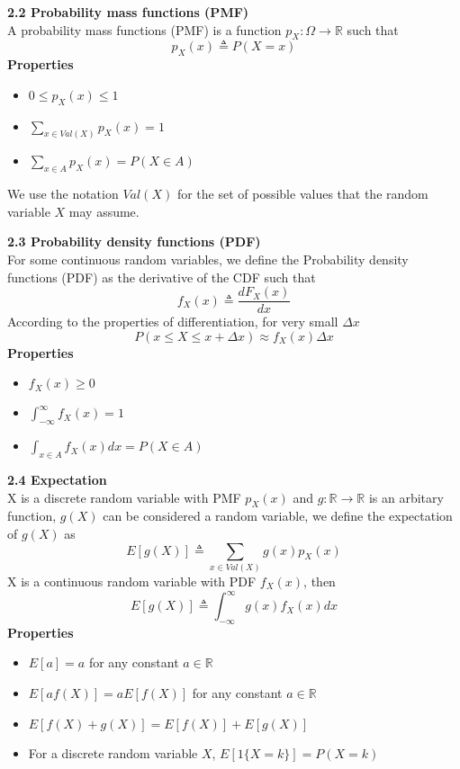 \documentclass[10pt,a4paper,oneside]{beamer}
\begin{document}
\begin{frame}
\vspace{0.3cm}
{\bfseries 2.2 Probability mass functions (PMF)} 
\vspace{0.3cm}
\\A probability mass functions (PMF) is a function $p_{X} : \Omega \rightarrow\mathbb{R}$ such that
\[
p_{X}(x) \triangleq P(X = x)
\]
{\bfseries Properties}
\begin{itemize}
	\item $0 \leqslant p_{X}(x) \leqslant 1$
	\item $\sum_{x\in V al(X)}p_{X}(x)=1$ 
	\item $\sum_{x\in A}p_{X}(x)=P(X\in A)$ 
\end{itemize} 
\vspace{0.5cm}
We use the notation $Val(X)$ for the set of possible values that the random variable $X$ may assume.
\end{frame}
\begin{frame}
\vspace{0.3cm}
{\bfseries 2.3 Probability density functions (PDF)} 
\vspace{0.3cm}
\\For some continuous random variables, we define the Probability density functions (PDF) as the derivative of the CDF such that 
\[
f_{X}(x) \triangleq \frac{dF_X(x)}{dx}
\]
According to the properties of differentiation, for very small $\Delta x$
\[
P(x \leqslant X \leqslant x+\Delta x) \approx f_{X}(x) \Delta x
\]
{\bfseries Properties}
\begin{itemize}
	\item $f_{X}(x) \geqslant 0$
	\item $\int_{-\infty}^{\infty} f_{X}(x)=1$ 
	\item $\int_{x \in A} f_{X}(x) d x=P(X \in A)$
\end{itemize} 
\end{frame}
\begin{frame}
\vspace{0.1cm}
{\bfseries 2.4 Expectation} 
\vspace{0.3cm}
\\X is a discrete random variable with PMF $p_X(x)$ and $g : \mathbb{R} \rightarrow \mathbb{R}$ is an arbitary function, $g(X)$ can be considered a random variable, we define the expectation of $g(X)$ as
\[
E[g(X)] \triangleq \sum_{x \in V a l(X)} g(x) p_{X}(x)
\]
X is a continuous random variable with PDF $f_X(x)$, then
\[
E[g(X)] \triangleq \int_{-\infty}^{\infty} g(x) f_{X}(x) d x
\]
{\bfseries Properties}
\begin{itemize}
	\item $E[a]=a$ for any constant $a\in \mathbb{R}$
	\item $E[af(X)]=aE[f(X)]$ for any constant $a \in \mathbb{R}$
	\item $E[f(X)+g(X)]=E[f(X)]+E[g(X)]$
	\item For a discrete random variable $X$, $E[1\{X=k\}]=P(X=k)$
\end{itemize} 
\end{frame}
\end{document}
